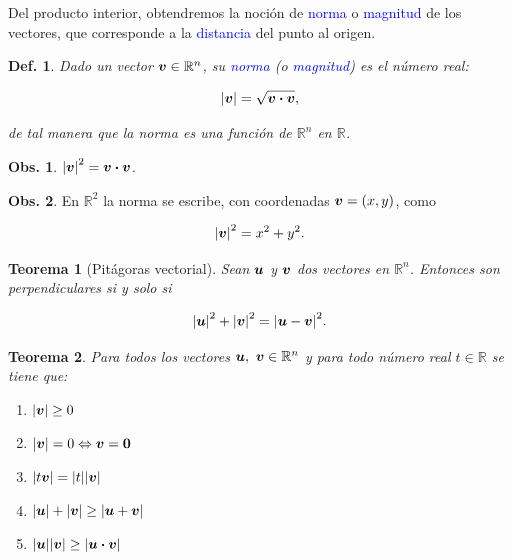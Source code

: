 \documentclass{article}
\theoremstyle{definicion}
\newtheorem{definicion}{Def.}
\theoremstyle{definition}             %
\theoremstyle{definition}             %
\theoremstyle{definition}
\theoremstyle{definition}
\theoremstyle{observacion}
\newtheorem{obs}{Obs.}
\theoremstyle{definition}
\theoremstyle{plain}
\newtheorem{theorem}{Teorema}
\theoremstyle{definition}
\theoremstyle{afirmacion}
\theoremstyle{notation}
\theoremstyle{definition}
\begin{document}
        Del producto interior, obtendremos la noción de \textcolor{blue}{norma} o \textcolor{blue}{magnitud} de los vectores, que corresponde a la \textcolor{blue}{distancia} del punto al origen.

        \begin{definicion}
            Dado un vector \(\vb*{v} \in \mathbb{R}^{n}\), su \textcolor{blue}{norma} (o \textcolor{blue}{magnitud}) es el número real:

            \begin{equation*}
                \abs{\vb*{v}} = \sqrt{\vb*{v} \vdot \vb*{v}},
            \end{equation*}

            de tal manera que la norma es una función de \(\mathbb{R}^{n}\) en \(\mathbb{R}\).
        \end{definicion}

        \begin{obs}
            \(\abs{\vb*{v}}^{2} = \vb*{v} \vdot \vb*{v}\).
        \end{obs}

        \begin{obs}
            En \(\mathbb{R}^{2}\) la norma se escribe, con coordenadas \(\vb*{v} = (x, y)\), como

            \begin{equation*}
                \abs{\vb*{v}}^{2} = x^{2} + y^{2}.
            \end{equation*}
        \end{obs}

        \begin{theorem}[Pitágoras vectorial]
            Sean \(\vb*{u}\) y \(\vb*{v}\) dos vectores en \(\mathbb{R}^{n}\). Entonces son perpendiculares si y solo si

            \begin{equation*}
                \abs{\vb*{u}}^{2} + \abs{\vb*{v}}^{2} = \abs{\vb*{u} - \vb*{v}}^{2}.
            \end{equation*}
        \end{theorem}

        \begin{theorem}
            Para todos los vectores \(\vb*{u},\ \vb*{v} \in \mathbb{R}^{n}\) y para todo número real \(t \in \mathbb{R}\) se tiene que:

            \begin{enumerate}[label = \textnormal{\Roman*)}]
                \item \(\abs{\vb*{v}} \geq 0\)
                \item \(\abs{\vb*{v}} = 0 \Leftrightarrow \vb*{v} = \vb*{0}\)
                \item \(\abs{t\vb*{v}} = \abs{t}\abs{\vb*{v}}\)
                \item \(\abs{\vb*{u}} + \abs{\vb*{v}} \geq \abs{\vb*{u} + \vb*{v}}\)
                \item \(\abs{\vb*{u}}\abs{\vb*{v}} \geq \abs{\vb*{u} \vdot \vb*{v}}\)
            \end{enumerate}
        \end{theorem}
\end{document}

